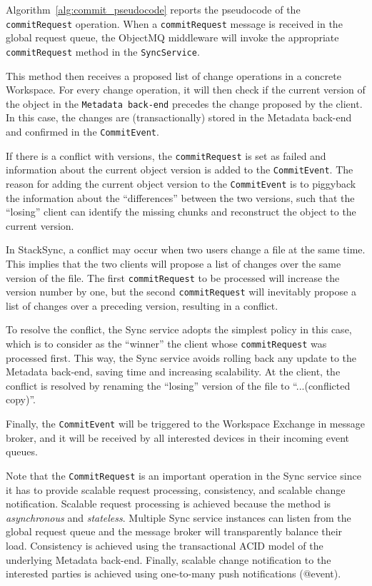 Algorithm~\ref{alg:commit_pseudocode} reports the pseudocode of the \texttt{commitRequest} operation. When a \texttt{commitRequest} message is received in the global request queue, the ObjectMQ middleware will invoke the appropriate \texttt{commitRequest} method in the \texttt{SyncService}. 


This method then receives a proposed list of change operations in a concrete Workspace. For every change operation, it will then check if the current version of the object in the \texttt{Metadata back-end} precedes the change proposed by the client. In this case, the changes are (transactionally) stored in the Metadata back-end and confirmed in the \texttt{CommitEvent}. 

If there is a conflict with versions, the \texttt{commitRequest} is set as failed and information about the current object version is added to the \texttt{CommitEvent}. The reason for adding the current object version to the \texttt{CommitEvent} is to piggyback the information about the ``differences'' between the two versions, such that the ``losing'' client can identify the missing chunks and reconstruct the object to the current version. 


In StackSync, a conflict may occur when two users change a file at the same time. This implies that the two clients will propose a list of changes over the same version of the file. The first \texttt{commitRequest} to be processed will
increase the version number by one, but the second \texttt{commitRequest} will inevitably propose a list of changes over a preceding version, resulting in a conflict. 

To resolve the conflict, the Sync service adopts the simplest policy in this case, which is to consider as the ``winner''  the client whose \texttt{commitRequest} was processed first. This way, the Sync service
avoids rolling back any update to the Metadata back-end, saving time and increasing scalability. At the client,
the conflict is resolved by renaming the ``losing'' version of the file to ``...(conflicted copy)''.

Finally, the \texttt{CommitEvent} will be triggered to the Workspace Exchange in message broker, and  it will be received by all interested devices in their incoming event queues. 

Note that the \texttt{CommitRequest} is an important operation in the Sync service since it has to provide scalable request processing, consistency, and scalable change notification. Scalable request processing is achieved because the method is \textit{asynchronous} and \textit{stateless}. Multiple Sync service instances can listen from the global request queue and the message broker will transparently
balance their load. Consistency is achieved using the transactional  ACID model of the underlying Metadata back-end. 
Finally, scalable change notification to the interested parties is achieved using one-to-many push notifications (@event).

